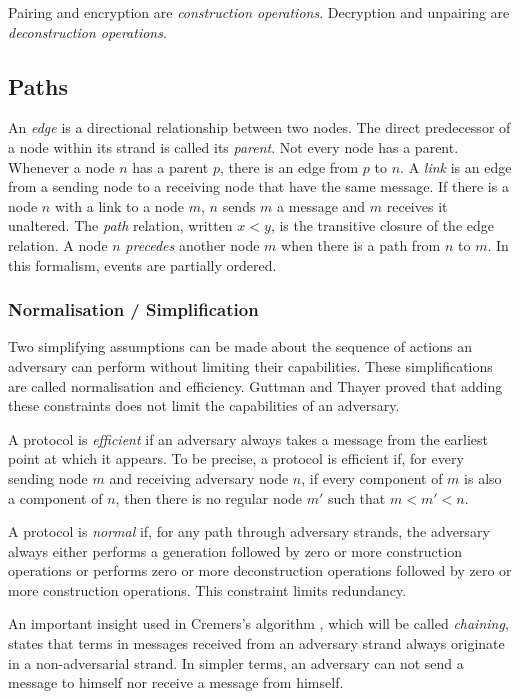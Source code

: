 			Pairing and encryption are \emph{construction operations}.
			Decryption and unpairing are \emph{deconstruction operations}.

		\subsection{Paths}

			An \emph{edge} is a directional relationship between two nodes.
			The direct predecessor of a node within its strand is called its
			\emph{parent}. Not every node has a parent. Whenever a node $n$ has
			a parent $p$, there is an edge from $p$ to $n$. A \emph{link} is an
			edge from a sending node to a receiving node that have the same
			message. If there is a node $n$ with a link to a node $m$, $n$
			sends $m$ a message and $m$ receives it unaltered. The \emph{path}
			relation, written $x < y$, is the transitive closure of the edge
			relation. A node $n$ \emph{precedes} another node $m$ when there is
			a path from $n$ to $m$. In this formalism, events are partially
			ordered.

		\subsubsection{Normalisation / Simplification}

			Two simplifying assumptions can be made about the sequence of
			actions an adversary can perform without limiting their
			capabilities. These simplifications are called normalisation and
			efficiency. Guttman and Thayer \cite{GJF02} proved that adding
			these constraints does not limit the capabilities of an adversary.

			A protocol is \emph{efficient} if an adversary always takes a
			message from the earliest point at which it appears. To be precise,
			a protocol is efficient if, for every sending node $m$ and
			receiving adversary node $n$, if every component of $m$ is also a
			component of $n$, then there is no regular node $m'$ such that $m <
			m' < n$.

			A protocol is \emph{normal} if, for any path through adversary
			strands, the adversary always either performs a generation followed
			by zero or more construction operations or performs zero or more
			deconstruction operations followed by zero or more construction
			operations. This constraint limits redundancy.

			An important insight used in Cremers's algorithm \cite{Cremers08},
			which will be called \emph{chaining}, states that terms in messages
			received from an adversary strand always originate in a
			non-adversarial strand. In simpler terms, an adversary can not send
			a message to himself nor receive a message from himself.

